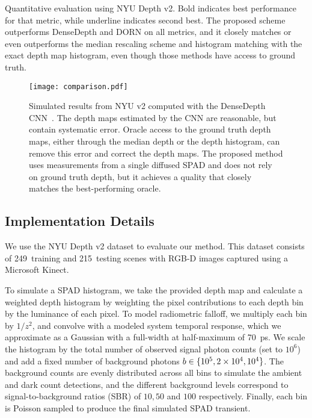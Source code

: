 \begin{table*}[!t]
\begin{center}

\caption{Quantitative evaluation using NYU Depth v2. Bold indicates best
performance for that metric, while underline indicates second best. The proposed
scheme outperforms DenseDepth and DORN on all metrics, and it closely matches or
even outperforms the median rescaling scheme and histogram matching with the
exact depth map histogram, even though those methods have access to ground truth. }
\label{tab:comparison}
\end{center}
\end{table*}

\begin{figure*}[!h]
  \texttt{[image: comparison.pdf]}
  \caption{Simulated results from NYU v2 computed with the DenseDepth
  CNN~\cite{Alhashim2018}. The depth maps estimated by the CNN are reasonable,
  but contain systematic error. Oracle access to the ground truth depth maps,
  either through the median depth or the depth histogram, can remove this error
  and correct the depth maps. The proposed method uses measurements from a single diffused SPAD and does not rely on ground truth depth, but it achieves a quality that closely matches the best-performing oracle.}
	\label{fig:results_simulated}
\end{figure*}


\subsection{Implementation Details}

We use the NYU Depth v2 dataset to evaluate our method. This dataset consists of
249~training and 215~testing scenes with RGB-D images captured using a Microsoft
Kinect.

To simulate a SPAD histogram, we take the provided depth map and 
calculate a weighted depth histogram by weighting the pixel contributions to
each depth bin by the luminance of each pixel. To model radiometric falloff, we
multiply each bin by $1/z^2$, and convolve with a modeled system temporal
response, which we approximate as a Gaussian with a full-width at half-maximum of 70~ps. We scale
the histogram by the total number of observed signal photon counts (set to 
$10^6$) and  add a fixed number of background photons $b \in \{10^5, 2\times
10^4, 10^4\}$. The background counts are evenly distributed across all bins to simulate the ambient and dark
count detections, and the different background levels correspond to
signal-to-background ratios (SBR) of $10, 50$ and $100$ respectively. Finally,
each bin is Poisson sampled to produce the final simulated SPAD transient.

